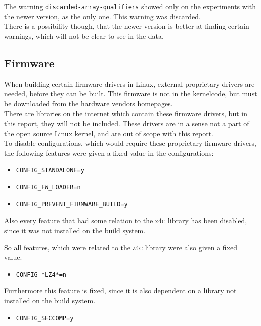 \documentclass[a4paper,11pt]{report}
\newcommand{\textcode}[1]{\fboxsep=1pt\texttt{\colorbox{gray!20}{#1}}}
\begin{document}
The warning \texttt{discarded-array-qualifiers} showed only on the experiments 
with the newer version, as the only one. This warning was discarded.
\\

There is a possibility though, that the newer version is better 
at finding certain warnings, which will not be clear to see in the data.



            \subsection{Firmware}
When building certain firmware drivers in Linux, external proprietary drivers 
are needed, before they can be built. This firmware is not in the kernelcode, 
but must be downloaded from the hardware vendors homepages.
\\

There are libraries on the internet which contain these firmware drivers, but 
in this report, they will not be included. These drivers are in a sense not a 
part of the open source Linux kernel, and are out of scope with this report.
\\

To disable configurations, which would require these proprietary firmware 
drivers, the following features were given a fixed value in the configurations:

\begin{itemize}
    \item \textcode{CONFIG\_STANDALONE=y}
    \item \textcode{CONFIG\_FW\_LOADER=n}
    \item \textcode{CONFIG\_PREVENT\_FIRMWARE\_BUILD=y}
\end{itemize}


Also every feature that had some relation to the \textsc{z4c} library has been 
disabled, since it was not installed on the build system.

So all features, which were related to the \textsc{z4c} library were also given 
a fixed value.

\begin{itemize}
    \item \textcode{CONFIG\_*LZ4*=n}
\end{itemize}


Furthermore this feature is fixed, since it is also dependent on a library not 
installed on the build system.

\begin{itemize}
    \item \textcode{CONFIG\_SECCOMP=y}
\end{itemize}
\end{document}

